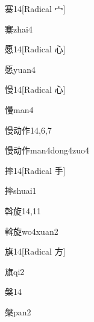 \begin{entry}{寨}{14}[Radical 宀]
  \begin{phonetics}{寨}{zhai4}
  \end{phonetics}
\end{entry}

\begin{entry}{愿}{14}[Radical 心]
  \begin{phonetics}{愿}{yuan4}
  \end{phonetics}
\end{entry}

\begin{entry}{慢}{14}[Radical 心]
  \begin{phonetics}{慢}{man4}
  \end{phonetics}
\end{entry}

\begin{entry}{慢动作}{14,6,7}
  \begin{phonetics}{慢动作}{man4dong4zuo4}
  \end{phonetics}
\end{entry}

\begin{entry}{摔}{14}[Radical 手]
  \begin{phonetics}{摔}{shuai1}
  \end{phonetics}
\end{entry}

\begin{entry}{斡旋}{14,11}
  \begin{phonetics}{斡旋}{wo4xuan2}
  \end{phonetics}
\end{entry}

\begin{entry}{旗}{14}[Radical 方]
  \begin{phonetics}{旗}{qi2}
  \end{phonetics}
\end{entry}

\begin{entry}{槃}{14}
  \begin{phonetics}{槃}{pan2}
  \end{phonetics}
\end{entry}

